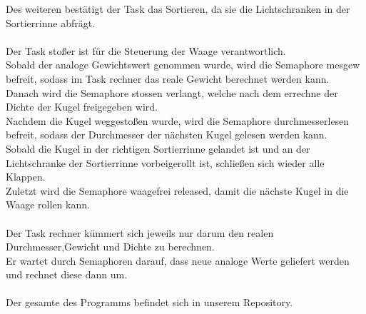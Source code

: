 Des weiteren bestätigt der Task das Sortieren, da sie die Lichtschranken in der Sortierrinne abfrägt.\\
\\
Der Task stoßer ist für die Steuerung der Waage verantwortlich.\\
Sobald der analoge Gewichtswert genommen wurde, wird die Semaphore mesgew befreit, sodass im Task rechner das reale Gewicht berechnet werden kann.\\
Danach wird die Semaphore stossen verlangt, welche nach dem errechne der Dichte der Kugel freigegeben wird.\\
Nachdem die Kugel weggestoßen wurde, wird die Semaphore durchmesserlesen befreit, sodass der Durchmesser der nächsten Kugel gelesen werden kann.\\
Sobald die Kugel in der richtigen Sortierrinne gelandet ist und an der Lichtschranke der Sortierrinne vorbeigerollt ist, schließen sich wieder alle Klappen.\\
Zuletzt wird die Semaphore waagefrei released, damit die nächste Kugel in die Waage rollen kann.\\
\\
Der Task rechner kümmert sich jeweils nur darum den realen Durchmesser,Gewicht und Dichte zu berechnen.\\
Er wartet durch Semaphoren darauf, dass neue analoge Werte geliefert werden und rechnet diese dann um.\\
\\
Der gesamte  des Programms befindet sich in unserem Repository.\\ 
\newpage




